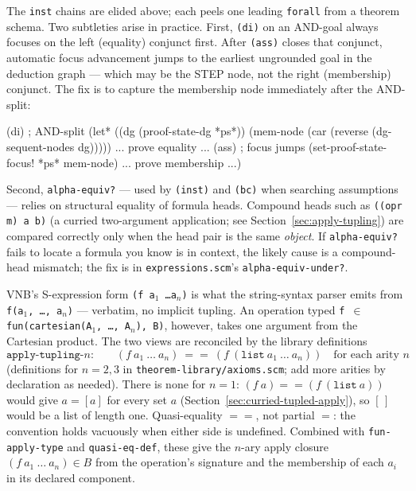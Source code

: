 \begin{remark}
The \texttt{inst} chains are elided above; each peels one leading
\texttt{forall} from a theorem schema.  Two subtleties arise in practice.
First, \texttt{(di)} on an AND-goal always focuses on the left (equality)
conjunct first.  After \texttt{(ass)} closes that conjunct, automatic
focus advancement jumps to the earliest ungrounded goal in the deduction
graph --- which may be the STEP node, not the right (membership) conjunct.
The fix is to capture the membership node
immediately after the AND-split:
\begin{VNBcode}
(di)   ; AND-split
(let* ((dg       (proof-state-dg *ps*))
       (mem-node (car (reverse (dg-sequent-nodes dg)))))
  ... prove equality ... (ass)   ; focus jumps
  (set-proof-state-focus! *ps* mem-node)
  ... prove membership ...)
\end{VNBcode}

Second, \texttt{alpha-equiv?} --- used by \texttt{(inst)} and
\texttt{(bc)} when searching assumptions --- relies on structural
equality of formula heads.  Compound heads such as
\texttt{((opr m) a b)} (a curried two-argument application; see
Section~\ref{sec:apply-tupling}) are compared correctly only when
the head pair is the same \emph{object}.  If \texttt{alpha-equiv?}
fails to locate a formula you know is in context, the likely cause
is a compound-head mismatch; the fix is in
\texttt{expressions.scm}'s \texttt{alpha-equiv-under?}.
\end{remark}

\begin{remark}
\label{sec:apply-tupling}
VNB's S-expression form \texttt{(f a$_1$ \ldots a$_n$)} is what the
string-syntax parser emits from \texttt{f(a$_1$,\,\ldots,\,a$_n$)} ---
verbatim, no implicit tupling.  An operation typed
\texttt{f $\in$ fun(cartesian(A$_1$,\,\ldots,\,A$_n$),~B)}, however,
takes one argument from the Cartesian product.  The two views are
reconciled by the library definitions
\begin{equation*}
\texttt{apply-tupling-$n$:} \qquad
(f\ a_1\ \ldots\ a_n)\ \mathrel{==}\ (f\ (\texttt{list}\ a_1\ \ldots\ a_n))
\quad\text{for each arity }n
\end{equation*}
(definitions for $n=2,3$ in \texttt{theorem-library/axioms.scm};
add more arities by declaration as needed).  There is none for $n=1$:
$(f\ a) \mathrel{==} (f\ (\texttt{list}\ a))$ would give $a=[a]$ for every set $a$
(Section~\ref{sec:curried-tupled-apply}), so $[\,]$ would be a list of length one.  Quasi-equality
$\mathrel{==}$, not partial $=$: the convention holds vacuously when
either side is undefined.  Combined with \texttt{fun-apply-type} and
\texttt{quasi-eq-def}, these give the $n$-ary apply closure
\((f\ a_1\ \ldots\ a_n)\in B\) from the operation's signature and
the membership of each $a_i$ in its declared component.
\end{remark}

